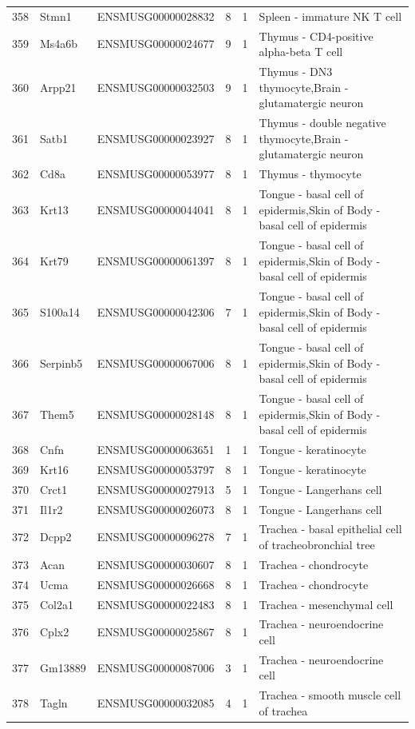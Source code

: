 \begin{table}[ht]
{\begin{tabular}{lllrrl}
        358 & Stmn1 & ENSMUSG00000028832 & 8 & 1 & Spleen - immature NK T cell \\
        359 & Ms4a6b & ENSMUSG00000024677 & 9 & 1 & Thymus - CD4-positive alpha-beta T cell \\
        360 & Arpp21 & ENSMUSG00000032503 & 9 & 1 & Thymus - DN3 thymocyte,Brain - glutamatergic neuron \\
        361 & Satb1 & ENSMUSG00000023927 & 8 & 1 & Thymus - double negative thymocyte,Brain - glutamatergic neuron \\
        362 & Cd8a & ENSMUSG00000053977 & 8 & 1 & Thymus - thymocyte \\
        363 & Krt13 & ENSMUSG00000044041 & 8 & 1 & Tongue - basal cell of epidermis,Skin of Body - basal cell of epidermis \\
        364 & Krt79 & ENSMUSG00000061397 & 8 & 1 & Tongue - basal cell of epidermis,Skin of Body - basal cell of epidermis \\
        365 & S100a14 & ENSMUSG00000042306 & 7 & 1 & Tongue - basal cell of epidermis,Skin of Body - basal cell of epidermis \\
        366 & Serpinb5 & ENSMUSG00000067006 & 8 & 1 & Tongue - basal cell of epidermis,Skin of Body - basal cell of epidermis \\
        367 & Them5 & ENSMUSG00000028148 & 8 & 1 & Tongue - basal cell of epidermis,Skin of Body - basal cell of epidermis \\
        368 & Cnfn & ENSMUSG00000063651 & 1 & 1 & Tongue - keratinocyte \\
        369 & Krt16 & ENSMUSG00000053797 & 8 & 1 & Tongue - keratinocyte \\
        370 & Crct1 & ENSMUSG00000027913 & 5 & 1 & Tongue - Langerhans cell \\
        371 & Il1r2 & ENSMUSG00000026073 & 8 & 1 & Tongue - Langerhans cell \\
        372 & Dcpp2 & ENSMUSG00000096278 & 7 & 1 & Trachea - basal epithelial cell of tracheobronchial tree \\
        373 & Acan & ENSMUSG00000030607 & 8 & 1 & Trachea - chondrocyte \\
        374 & Ucma & ENSMUSG00000026668 & 8 & 1 & Trachea - chondrocyte \\
        375 & Col2a1 & ENSMUSG00000022483 & 8 & 1 & Trachea - mesenchymal cell \\
        376 & Cplx2 & ENSMUSG00000025867 & 8 & 1 & Trachea - neuroendocrine cell \\
        377 & Gm13889 & ENSMUSG00000087006 & 3 & 1 & Trachea - neuroendocrine cell \\
        378 & Tagln & ENSMUSG00000032085 & 4 & 1 & Trachea - smooth muscle cell of trachea \\
        \bottomrule
    \end{tabular}
    }
\end{table}